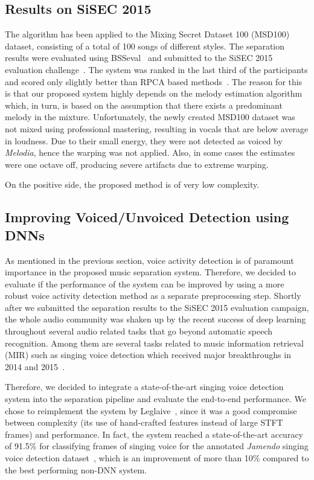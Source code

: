 \subsection{Results on SiSEC 2015}
\label{ssec:performance_sisec15}

The algorithm has been applied to the Mixing Secret Dataset 100 (MSD100) dataset, consisting of a total of 100 songs of different styles.
The separation results were evaluated using BSSeval~\cite{fevotte05} and submitted to the SiSEC 2015 evaluation challenge~\cite{ono15}.
The system was ranked in the last third of the participants and scored only slightly better than RPCA based methods~\cite{huang12}.
The reason for this is that our proposed system highly depends on the melody estimation algorithm which, in turn, is based on the assumption that there exists a predominant melody in the mixture.
Unfortunately, the newly created MSD100 dataset was not mixed using professional mastering, resulting in vocals that are below average in loudness.
Due to their small energy, they were not detected as voiced by \emph{Melodia}, hence the warping was not applied. Also, in some cases the estimates were one octave off, producing severe artifacts due to extreme warping.\par
On the positive side, the proposed method is of very low complexity.

\subsection{Improving Voiced/Unvoiced Detection using DNNs}

As mentioned in the previous section, voice activity detection is of paramount importance in the proposed music separation system.
Therefore, we decided to evaluate if the performance of the system can be improved by using a more robust voice activity detection method as a separate preprocessing step.
Shortly after we submitted the separation results to the SiSEC 2015 evaluation campaign, the whole audio community was shaken up by the recent success of deep learning throughout several audio related tasks that go beyond automatic speech recognition.
Among them are several tasks related to music information retrieval (MIR) such as singing voice detection which received major breakthroughs in 2014 and 2015~\cite{lehner14, lehner15, Leglaive15, schlueter15}.
\par
Therefore, we decided to integrate a state-of-the-art singing voice detection system into the separation pipeline and evaluate the end-to-end performance.
We chose to reimplement the system by Leglaive~\cite{Leglaive15}, since it was a good compromise between complexity (its use of hand-crafted features instead of large STFT frames) and performance.
In fact, the system reached a state-of-the-art accuracy of 91.5\% for classifying frames of singing voice for the annotated \emph{Jamendo} singing voice detection dataset~\cite{ramona08}, which is an improvement of more than 10\% compared to the best performing non-DNN system.

